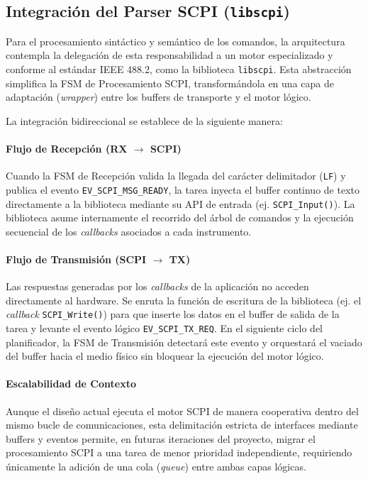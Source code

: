 \subsection{Integración del Parser SCPI (\texttt{libscpi})}
\label{subsec:integracion-libscpi}

Para el procesamiento sintáctico y semántico de los comandos, la arquitectura contempla la delegación de esta responsabilidad a un motor especializado y conforme al estándar IEEE 488.2, como la biblioteca \texttt{libscpi}. Esta abstracción simplifica la FSM de Procesamiento SCPI, transformándola en una capa de adaptación (\textit{wrapper}) entre los buffers de transporte y el motor lógico.

La integración bidireccional se establece de la siguiente manera:

\paragraph{Flujo de Recepción (RX $\rightarrow$ SCPI)}
Cuando la FSM de Recepción valida la llegada del carácter delimitador (\texttt{LF}) y publica el evento \texttt{EV\_SCPI\_MSG\_READY}, la tarea inyecta el buffer continuo de texto directamente a la biblioteca mediante su API de entrada (ej. \texttt{SCPI\_Input()}). La biblioteca asume internamente el recorrido del árbol de comandos y la ejecución secuencial de los \textit{callbacks} asociados a cada instrumento.

\paragraph{Flujo de Transmisión (SCPI $\rightarrow$ TX)}
Las respuestas generadas por los \textit{callbacks} de la aplicación no acceden directamente al hardware. Se enruta la función de escritura de la biblioteca (ej. el \textit{callback} \texttt{SCPI\_Write()}) para que inserte los datos en el buffer de salida de la tarea y levante el evento lógico \texttt{EV\_SCPI\_TX\_REQ}. En el siguiente ciclo del planificador, la FSM de Transmisión detectará este evento y orquestará el vaciado del buffer hacia el medio físico sin bloquear la ejecución del motor lógico.

\paragraph{Escalabilidad de Contexto}
Aunque el diseño actual ejecuta el motor SCPI de manera cooperativa dentro del mismo bucle de comunicaciones, esta delimitación estricta de interfaces mediante buffers y eventos permite, en futuras iteraciones del proyecto, migrar el procesamiento SCPI a una tarea de menor prioridad independiente, requiriendo únicamente la adición de una cola (\textit{queue}) entre ambas capas lógicas.
